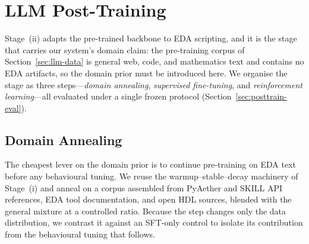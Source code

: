 ﻿\section{LLM Post-Training}\label{sec:llm-posttrain}

Stage~(ii) adapts the pre-trained backbone to EDA scripting, and it is the stage that carries our system's domain claim: the pre-training corpus of Section~\ref{sec:llm-data} is general web, code, and mathematics text and contains no EDA artifacts, so the domain prior must be introduced here.
We organise the stage as three steps---\emph{domain annealing}, \emph{supervised fine-tuning}, and \emph{reinforcement learning}---all evaluated under a single frozen protocol (Section~\ref{sec:posttrain-eval}).

\subsection{Domain Annealing}\label{sec:posttrain-anneal}
The cheapest lever on the domain prior is to continue pre-training on EDA text before any behavioural tuning.
We reuse the warmup--stable--decay machinery of Stage~(i) and anneal on a corpus assembled from PyAether and SKILL API references, EDA tool documentation, and open HDL sources, blended with the general mixture at a controlled ratio.
Because the step changes only the data distribution, we contrast it against an SFT-only control to isolate its contribution from the behavioural tuning that follows.

